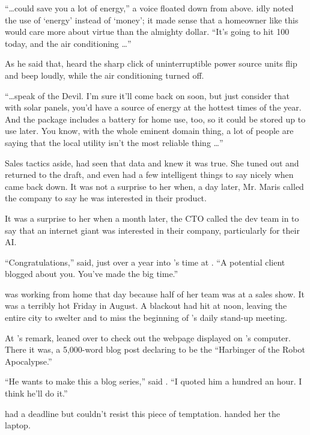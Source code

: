 ``\dots could save you a lot of energy,'' a voice floated down from above. {\protag} idly noted the use of `energy' instead of `money'; it made sense that a homeowner like this would care more about virtue than the almighty dollar. ``It's going to hit 100 today, and the air conditioning \dots''

As he said that, {\protag} heard the sharp click of uninterruptible power source units flip and beep loudly, while the air conditioning turned off.

``\dots speak of the Devil. I'm sure it'll come back on soon, but just consider that with solar panels, you'd have a source of energy at the hottest times of the year. And the package includes a battery for home use, too, so it could be stored up to use later. You know, with the whole eminent domain thing, a lot of people are saying that the local utility isn't the most reliable thing \dots''

Sales tactics aside, {\protag} had seen that data and knew it was true. She tuned out and returned to the draft, and even had a few intelligent things to say nicely when \energyJerk{} came back down. It was not a surprise to her when, a day later, Mr. Maris called the company to say he was interested in their product.

It was a surprise to her when a month later, the CTO called the dev team in to say that an internet giant was interested in their company, particularly for their AI.

\sectionBreak{}

``Congratulations,'' {\sidetag} said, just over a year into {\protag}’s time at \energyCompany{}. ``A potential client blogged about you. You've made the big time.''

{\protag} was working from home that day because half of her team was at a sales show. It was a terribly hot Friday in August. A blackout had hit \crunchyCity{} at noon, leaving the entire city to swelter and {\protag} to miss the beginning of \energyCompany{}'s daily stand-up meeting.

At {\sidetag}'s remark, {\protag} leaned over to check out the webpage displayed on {\sidetag}'s computer. There it was, a 5,000-word blog post declaring \energyCompany{} to be the ``Harbinger of the Robot Apocalypse.''

``He wants to make this a blog series,'' said {\sidetag}. ``I quoted him a hundred an hour. I think he'll do it.''

{\protag} had a deadline but couldn't resist this piece of temptation. {\sidetag} handed her the laptop.

